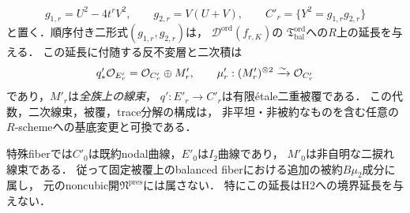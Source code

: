 \begin{theorem}[二つのtrait上でのbalanced標的への延長]
\label{thm:qa-fricke-trait-balanced-extension}
\[
 g_{1,r}=U^2-4t^rV^2,\qquad g_{2,r}=V(U+V),\qquad
 C'_r=\{Y^2=g_{1,r}g_{2,r}\}
\]
と置く．順序付き二形式$(g_{1,r},g_{2,r})$は，
$\mathscr D^{\mathrm{ord}}(f_{r,K})$の
$\mathfrak T_{\mathrm{bal}}^{\mathrm{ord}}$への$R$上の延長を与える．
この延長に付随する反不変層と二次積は
\[
 q'_*\mathcal O_{E'_r}=\mathcal O_{C'_r}\oplus M'_r,
 \qquad \mu'_r:(M'_r)^{\otimes2}\xrightarrow{\sim}\mathcal O_{C'_r}
\]
であり，$M'_r$は\emph{全族上の線束}，
$q':E'_r\to C'_r$は有限\'etale二重被覆である．
この代数，二次線束，被覆，trace分解の構成は，
非平坦・非被約なものを含む任意の$R$-schemeへの基底変更と可換である．

特殊fiberでは$C'_0$は既約nodal曲線，$E'_0$は$I_2$曲線であり，
$M'_0$は非自明な二捩れ線束である．
従って固定被覆上のbalanced fiberにおける追加の被約$B\mu_2$成分に属し，
元のnoncubic開$\mathfrak N^{\mathrm{pres}}$には属さない．
特にこの延長はH2への境界延長を与えない．
\end{theorem}
